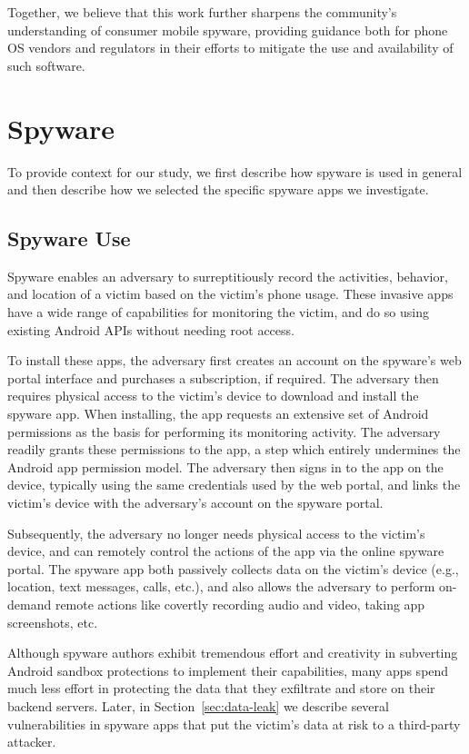 \documentclass[sigconf,balance=false]{acmart}
\begin{document}
Together, we believe that this work further sharpens the community's understanding
of consumer mobile spyware, providing guidance both for phone OS
vendors and regulators in their efforts to mitigate the use and
availability of such software.




%



\section{Spyware}

To provide context for our study, we first describe how spyware is
used in general and then describe how we selected the specific spyware
apps we investigate.

\subsection{Spyware Use}

Spyware enables an adversary to surreptitiously record the activities,
behavior, and location of a victim based on the victim's phone usage.
These invasive apps have a wide range of capabilities for
monitoring the victim, and do so using existing Android APIs without
needing root access.

To install these apps, the adversary first creates an account on the spyware's web portal
interface and purchases a subscription, if required.  The adversary then
requires physical access to the victim's device to download and
install the spyware app.  When installing, the app requests an
extensive set of Android permissions as the basis for performing its
monitoring activity.  The adversary readily grants these permissions to
the app, a step which entirely undermines the Android app permission
model.  The adversary then signs in to the app on the device, typically
using the same credentials used by the web portal, and links the
victim's device with the adversary's account on the spyware portal.

Subsequently, the adversary no longer needs physical access to the victim's device, and
can remotely control the actions of the app via the online spyware portal.
The spyware app both passively collects data on the victim's device (e.g.,
location, text messages, calls, etc.), and also allows the adversary to
perform on-demand remote actions like covertly recording audio and
video, taking app screenshots, etc.

Although spyware authors exhibit tremendous effort and creativity in subverting
Android sandbox protections to implement their capabilities, many apps spend
much less effort in protecting the data that they exfiltrate and store on
their backend servers. Later, in Section~\ref{sec:data-leak} we
describe several vulnerabilities in spyware apps that put the victim's
data at risk to a third-party attacker.
\end{document}
